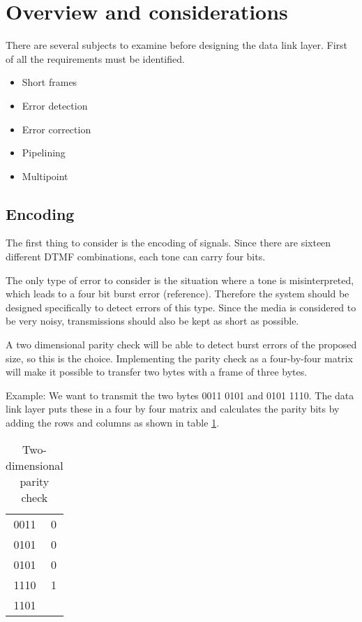 \section{Overview and considerations}\label{sec:dll_theory}

There are several subjects to examine before designing the data link layer.
First of all the requirements must be identified. 
\begin{itemize}
	\item Short frames
	\item Error detection
	\item Error correction
	\item Pipelining
	\item Multipoint
\end{itemize}

\subsection{Encoding}
The first thing to consider is the encoding of signals. Since there are sixteen
different DTMF combinations, each tone can carry four bits.

The only type of error to consider is the situation where a tone is
misinterpreted, which leads to a four bit burst error (reference). Therefore the
system should be designed specifically to detect errors of this type. Since the media
is considered to be very noisy, transmissions should also be kept as short as
possible.

A two dimensional parity check will be able to detect burst errors of the
proposed size, so this is the choice. Implementing the parity check as a
four-by-four matrix will make it possible to transfer two bytes with a frame of
three bytes.

Example: We want to transmit the two bytes 0011 0101 and 0101 1110. The data
link layer puts these in a four by four matrix and calculates the parity bits by
adding the rows and columns as shown in table \ref{tab:two_dimensional_parity_check}.

\begin{table}[htb]
	\centering
	\begin{tabular}{c|c}
	0011 & 0 \\
	0101 & 0 \\
	0101 & 0 \\
	1110 & 1 \\
	\hline
	1101 & \\
	\end{tabular}
	\caption{Two-dimensional parity check}
	\label{tab:two_dimensional_parity_check}
\end{table}

